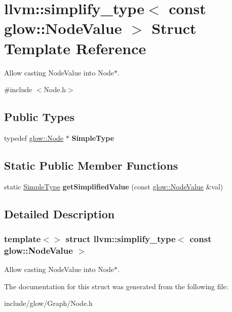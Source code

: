 \hypertarget{structllvm_1_1simplify__type_3_01const_01glow_1_1_node_value_01_4}{}\section{llvm\+:\+:simplify\+\_\+type$<$ const glow\+:\+:Node\+Value $>$ Struct Template Reference}
\label{structllvm_1_1simplify__type_3_01const_01glow_1_1_node_value_01_4}


Allow casting Node\+Value into Node$\ast$.  




{\ttfamily \#include $<$Node.\+h$>$}

\subsection*{Public Types}
\begin{DoxyCompactItemize}
\item 
\mbox{\label{structllvm_1_1simplify__type_3_01const_01glow_1_1_node_value_01_4_a51ea4e5910ad4d01a186f7fdbdc235bf}} 
typedef \hyperlink{classglow_1_1_node}{glow\+::\+Node} $\ast$ {\bfseries Simple\+Type}
\end{DoxyCompactItemize}
\subsection*{Static Public Member Functions}
\begin{DoxyCompactItemize}
\item 
\mbox{\label{structllvm_1_1simplify__type_3_01const_01glow_1_1_node_value_01_4_ac5459e8f35bcbd1b20230e55d60919c8}} 
static \hyperlink{classglow_1_1_node}{Simple\+Type} {\bfseries get\+Simplified\+Value} (const \hyperlink{structglow_1_1_node_value}{glow\+::\+Node\+Value} \&val)
\end{DoxyCompactItemize}


\subsection{Detailed Description}
\subsubsection*{template$<$$>$\newline
struct llvm\+::simplify\+\_\+type$<$ const glow\+::\+Node\+Value $>$}

Allow casting Node\+Value into Node$\ast$. 

The documentation for this struct was generated from the following file\+:\begin{DoxyCompactItemize}
\item 
include/glow/\+Graph/Node.\+h\end{DoxyCompactItemize}
